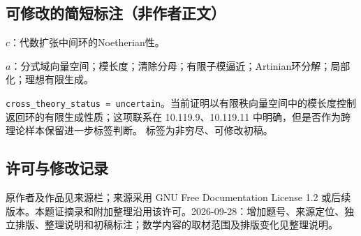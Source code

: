 \documentclass[UTF8,11pt]{ctexart}
\theoremstyle{definition}
\begin{document}
\subsection*{可修改的简短标注（非作者正文）}
$c$：代数扩张中间环的Noetherian性。

$a$：分式域向量空间；模长度；清除分母；有限子模逼近；Artinian环分解；局部化；理想有限生成。

\texttt{cross\_theory\_status = uncertain}。当前证明以有限秩向量空间中的模长度控制返回环的有限生成性质；这项联系在 10.119.9、10.119.11 中明确，但是否作为跨理论样本保留进一步标签判断。
标签为非穷尽、可修改初稿。
\subsection*{许可与修改记录}
原作者及作品见来源栏；来源采用 GNU Free Documentation License 1.2 或后续版本。本题证摘录和附加整理沿用该许可。2026-09-28：增加题号、来源定位、独立排版、整理说明和初稿标注；数学内容的取材范围及排版变化见整理说明。
\end{document}
